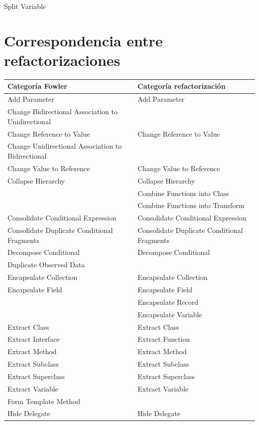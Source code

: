 \documentclass[11pt,a4paper,oneside]{book}
\begin{document}
Split Variable



\chapter*{Correspondencia entre refactorizaciones}

\begin{longtable}{|p{200pt}|p{200pt}|}
\footnotesize
 Categoría Fowler &Categoría refactorización\\ 
\hline
    Add Parameter & Add Parameter\\ 
    Change Bidirectional Association to Unidirectional & \\ 
    Change Reference to Value & Change Reference to Value\\ 
    Change Unidirectional Association to Bidirectional & \\ 
    Change Value to Reference & Change Value to Reference\\ 
    Collapse Hierarchy & Collapse Hierarchy\\ 
 & Combine Functions into Class\\ 
 & Combine Functions into Transform\\ 
    Consolidate Conditional Expression & Consolidate Conditional Expression\\ 
    Consolidate Duplicate Conditional Fragments & Consolidate Duplicate Conditional Fragments\\ 
    Decompose Conditional & Decompose Conditional\\ 
    Duplicate Observed Data & \\ 
    Encapsulate Collection & Encapsulate Collection\\ 
    Encapsulate Field & Encapsulate Field \\ 
 & Encapsulate Record\\ 
 & Encapsulate Variable\\ 
    Extract Class & Extract Class\\ 
    Extract Interface & Extract Function\\ 
    Extract Method & Extract Method\\ 
    Extract Subclass & Extract Subclass \\ 
    Extract Superclass & Extract Superclass\\ 
    Extract Variable & Extract Variable\\ 
    Form Template Method & \\ 
    Hide Delegate & Hide Delegate\\ 

\end{longtable}
\end{document}
